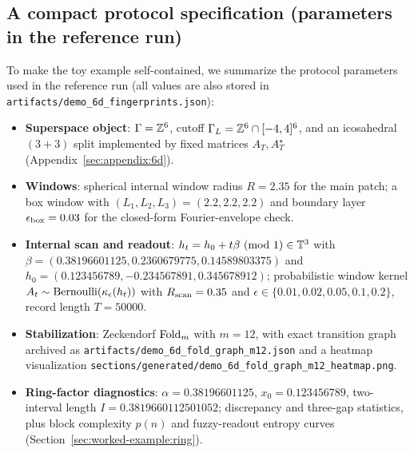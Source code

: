 \subsection{A compact protocol specification (parameters in the reference run)}\label{sec:worked-example:protocol-spec}
To make the toy example self-contained, we summarize the protocol parameters used in the reference run (all values are also stored in \texttt{artifacts/demo\_6d\_fingerprints.json}):
\begin{itemize}[leftmargin=*,itemsep=2pt]
  \item \textbf{Superspace object}: $\Gamma=\mathbb{Z}^6$, cutoff $\Gamma_L=\mathbb{Z}^6\cap[-4,4]^6$, and an icosahedral $(3+3)$ split implemented by fixed matrices $A_T,A_T^\star$ (Appendix~\ref{sec:appendix:6d}).
  \item \textbf{Windows}: spherical internal window radius $R=2.35$ for the main patch; a box window with $(L_1,L_2,L_3)=(2.2,2.2,2.2)$ and boundary layer $\epsilon_{\rm box}=0.03$ for the closed-form Fourier-envelope check.
  \item \textbf{Internal scan and readout}: $h_t=h_0+t\beta\ (\mathrm{mod}\ 1)\in\mathbb{T}^3$ with $\beta=(0.38196601125,0.2360679775,0.14589803375)$ and $h_0=(0.123456789,-0.234567891,0.345678912)$; probabilistic window kernel $A_t\sim{\rm Bernoulli}(\kappa_\epsilon(h_t))$ with $R_{\rm scan}=0.35$ and $\epsilon\in\{0.01,0.02,0.05,0.1,0.2\}$, record length $T=50000$.
  \item \textbf{Stabilization}: Zeckendorf $\mathrm{Fold}_m$ with $m=12$, with exact transition graph archived as \texttt{artifacts/demo\_6d\_fold\_graph\_m12.json} and a heatmap visualization \texttt{sections/generated/demo\_6d\_fold\_graph\_m12\_heatmap.png}.
  \item \textbf{Ring-factor diagnostics}: $\alpha=0.38196601125$, $x_0=0.123456789$, two-interval length $I=0.3819660112501052$; discrepancy and three-gap statistics, plus block complexity $p(n)$ and fuzzy-readout entropy curves (Section~\ref{sec:worked-example:ring}).
\end{itemize}

